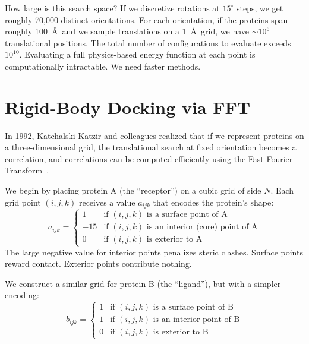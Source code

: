 How large is this search space?
If we discretize rotations at $15^\circ$ steps, we get roughly 70,000 distinct orientations.
For each orientation, if the proteins span roughly 100~\AA\ and we sample translations on a 1~\AA\ grid, we have $\sim 10^6$ translational positions.
The total number of configurations to evaluate exceeds $10^{10}$.
Evaluating a full physics-based energy function at each point is computationally intractable.
We need faster methods.

\section{Rigid-Body Docking via FFT}
\label{sec:fft-docking}

In 1992, Katchalski-Katzir and colleagues realized that if we represent proteins on a three-dimensional grid, the translational search at fixed orientation becomes a correlation, and correlations can be computed efficiently using the Fast Fourier Transform~\cite{katchalskikatzir1992}.

We begin by placing protein A (the ``receptor'') on a cubic grid of side $N$.
Each grid point $(i,j,k)$ receives a value $a_{ijk}$ that encodes the protein's shape:
\begin{equation}
\label{eq:grid-receptor}
a_{ijk} = \begin{cases}
1 & \text{if $(i,j,k)$ is a surface point of A} \\
-15 & \text{if $(i,j,k)$ is an interior (core) point of A} \\
0 & \text{if $(i,j,k)$ is exterior to A}
\end{cases}
\end{equation}
The large negative value for interior points penalizes steric clashes.
Surface points reward contact.
Exterior points contribute nothing.

We construct a similar grid for protein B (the ``ligand''), but with a simpler encoding:
\begin{equation}
\label{eq:grid-ligand}
b_{ijk} = \begin{cases}
1 & \text{if $(i,j,k)$ is a surface point of B} \\
1 & \text{if $(i,j,k)$ is an interior point of B} \\
0 & \text{if $(i,j,k)$ is exterior to B}
\end{cases}
\end{equation}

